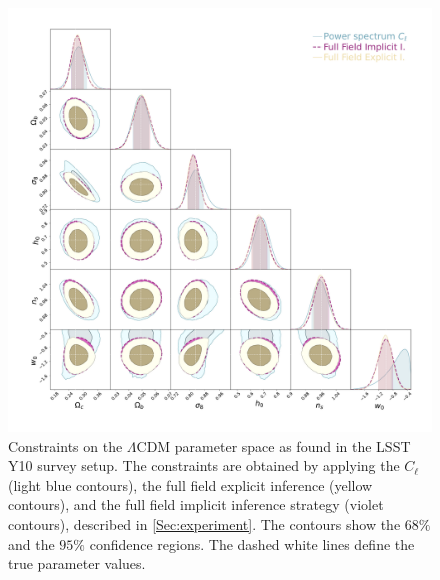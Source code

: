\documentclass{aa}
\begin{document}
\begin{figure}
    \centering
        \includegraphics[width=\textwidth]{figures/contours_posterior_imp_ex_ps.pdf}
        \caption{
        Constraints on the $\Lambda$CDM parameter space as found in the LSST Y10 survey setup. The constraints are obtained by applying the $C_{\ell}$ (light blue contours), the full field explicit inference (yellow contours), and the full field implicit inference strategy (violet contours), described in \autoref{Sec:experiment}.
        The contours show the $68\%$ and the $95\%$  confidence regions. The dashed white lines define the true parameter values.}
        \label{fig:contours_posterior_imp_ex_ps}
\end{figure}
\end{document}
